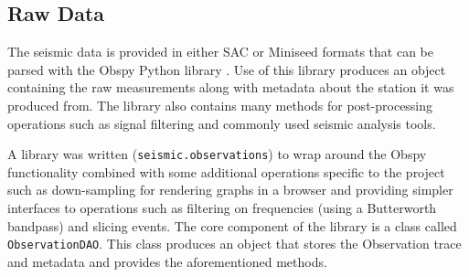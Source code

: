\documentclass[../report.tex]{subfiles}
\begin{document}
\subsection{Raw Data}
	The seismic data is provided in either SAC or Miniseed formats that can be parsed with the Obspy Python library \citep{obspy}.  Use of this library produces an object containing the raw measurements along with metadata about the station it was produced from.  The library also contains many methods for post-processing operations such as signal filtering and commonly used seismic analysis tools.
	
	A library was written (\verb|seismic.observations|) to wrap around the Obspy functionality combined with some additional operations specific to the project such as down-sampling for rendering graphs in a browser and providing simpler interfaces to operations such as filtering on frequencies (using a Butterworth bandpass) and slicing events.  The core component of the library is a class called \verb|ObservationDAO|.  This class produces an object that stores the Observation trace and metadata and provides the aforementioned methods.
\end{document}
